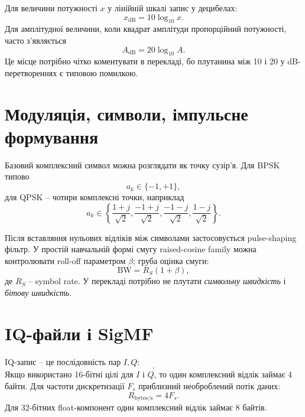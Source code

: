 Для величини потужності $x$ у лінійній шкалі запис у децибелах:
\begin{equation}
 x_{\mathrm{dB}} = 10\log_{10}x.
\end{equation}
Для амплітудної величини, коли квадрат амплітуди пропорційний потужності, часто з'являється
\begin{equation}
 A_{\mathrm{dB}} = 20\log_{10}A.
\end{equation}
Це місце потрібно чітко коментувати в перекладі, бо плутанина між 10 і 20 у dB-перетвореннях є типовою помилкою.

\section{Модуляція, символи, імпульсне формування}
Базовий комплексний символ можна розглядати як точку сузір'я. Для BPSK типово
\begin{equation}
 a_k \in \{-1,+1\},
\end{equation}
для QPSK -- чотири комплексні точки, наприклад
\begin{equation}
 a_k \in \left\{\frac{1+j}{\sqrt 2},\frac{-1+j}{\sqrt 2},\frac{-1-j}{\sqrt 2},\frac{1-j}{\sqrt 2}\right\}.
\end{equation}

Після вставляння нульових відліків між символами застосовується pulse-shaping фільтр. У простій навчальній формі смугу raised-cosine family можна контролювати roll-off параметром $\beta$; груба оцінка смуги:
\begin{equation}
 \mathrm{BW} = R_S(1+\beta),
\end{equation}
де $R_S$ -- symbol rate. У перекладі потрібно не плутати \emph{символьну швидкість} і \emph{бітову швидкість}.

\section{IQ-файли і SigMF}
IQ-запис -- це послідовність пар $I,Q$:
\begin{equation}
 [I_0,Q_0,I_1,Q_1,I_2,Q_2,\dots].
\end{equation}
Якщо використано 16-бітні цілі для $I$ і $Q$, то один комплексний відлік займає 4 байти. Для частоти дискретизації $F_s$ приблизний необроблений потік даних:
\begin{equation}
 R_{\mathrm{bytes/s}} = 4F_s.
\end{equation}
Для 32-бітних float-компонент один комплексний відлік займає 8 байтів.

